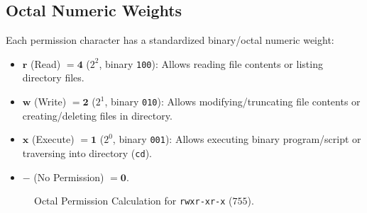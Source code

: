 \subsection{Octal Numeric Weights}
Each permission character has a standardized binary/octal numeric weight:
\begin{itemize}
    \item $\mathbf{r}$ (Read) $= \mathbf{4}$ ($2^2$, binary \texttt{100}): Allows reading file contents or listing directory files.
    \item $\mathbf{w}$ (Write) $= \mathbf{2}$ ($2^1$, binary \texttt{010}): Allows modifying/truncating file contents or creating/deleting files in directory.
    \item $\mathbf{x}$ (Execute) $= \mathbf{1}$ ($2^0$, binary \texttt{001}): Allows executing binary program/script or traversing into directory (\texttt{cd}).
    \item \textbf{$-$} (No Permission) $= \mathbf{0}$.
\end{itemize}

\begin{figure}[htbp]
\centering
{}
\caption{Octal Permission Calculation for \texttt{rwxr-xr-x} ($755$).}
\label{fig:chmod-octal-calculation}
\end{figure}

